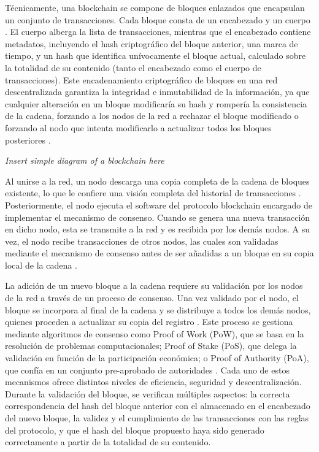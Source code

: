 Técnicamente, una blockchain se compone de bloques enlazados que encapsulan un conjunto de transacciones. Cada bloque consta de un encabezado y un cuerpo \cite{tripathi2023comprehensive}. El cuerpo alberga la lista de transacciones, mientras que el encabezado contiene metadatos, incluyendo el hash criptográfico del bloque anterior, una marca de tiempo, y un hash que identifica unívocamente el bloque actual, calculado sobre la totalidad de su contenido (tanto el encabezado como el cuerpo de transacciones). Este encadenamiento criptográfico de bloques en una red descentralizada garantiza la integridad e inmutabilidad de la información, ya que cualquier alteración en un bloque modificaría su hash y rompería la consistencia de la cadena, forzando a los nodos de la red a rechazar el bloque modificado o forzando al nodo que intenta modificarlo a actualizar todos los bloques posteriores \cite{sunny2022systematic}.

\begin{block}[todo] %
    \textit{Insert simple diagram of a blockchain here}
\end{block}

Al unirse a la red, un nodo descarga una copia completa de la cadena de bloques existente, lo que le confiere una visión completa del historial de transacciones \cite{bulkowska2023implementation}. Posteriormente, el nodo ejecuta el software del protocolo blockchain encargado de implementar el mecanismo de consenso. Cuando se genera una nueva transacción en dicho nodo, esta se transmite a la red y es recibida por los demás nodos. A su vez, el nodo recibe transacciones de otros nodos, las cuales son validadas mediante el mecanismo de consenso antes de ser añadidas a un bloque en su copia local de la cadena \cite{bulkowska2023implementation}.

La adición de un nuevo bloque a la cadena requiere su validación por los nodos de la red a través de un proceso de consenso. Una vez validado por el nodo, el bloque se incorpora al final de la cadena y se distribuye a todos los demás nodos, quienes proceden a actualizar su copia del registro \cite{bulkowska2023implementation}. Este proceso se gestiona mediante algoritmos de consenso como Proof of Work (PoW), que se basa en la resolución de problemas computacionales; Proof of Stake (PoS), que delega la validación en función de la participación económica; o Proof of Authority (PoA), que confía en un conjunto pre-aprobado de autoridades \cite{diaz2022protocolos}. Cada uno de estos mecanismos ofrece distintos niveles de eficiencia, seguridad y descentralización. Durante la validación del bloque, se verifican múltiples aspectos: la correcta correspondencia del hash del bloque anterior con el almacenado en el encabezado del nuevo bloque, la validez y el cumplimiento de las transacciones con las reglas del protocolo, y que el hash del bloque propuesto haya sido generado correctamente a partir de la totalidad de su contenido.

